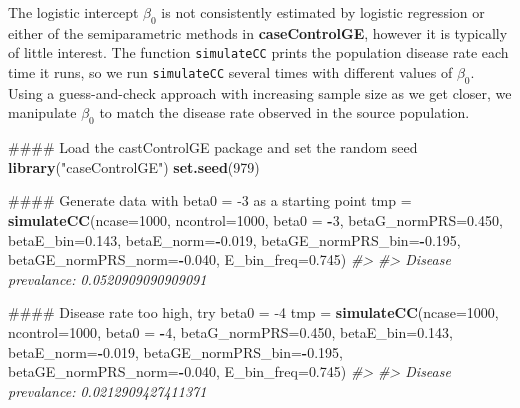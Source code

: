 \documentclass[]{article}
\newenvironment{Shaded}{\begin{snugshade}}{\end{snugshade}}
\newcommand{\KeywordTok}[1]{\textcolor[rgb]{0.13,0.29,0.53}{\textbf{#1}}}
\newcommand{\DataTypeTok}[1]{\textcolor[rgb]{0.13,0.29,0.53}{#1}}
\newcommand{\DecValTok}[1]{\textcolor[rgb]{0.00,0.00,0.81}{#1}}
\newcommand{\FloatTok}[1]{\textcolor[rgb]{0.00,0.00,0.81}{#1}}
\newcommand{\StringTok}[1]{\textcolor[rgb]{0.31,0.60,0.02}{#1}}
\newcommand{\CommentTok}[1]{\textcolor[rgb]{0.56,0.35,0.01}{\textit{#1}}}
\newcommand{\OperatorTok}[1]{\textcolor[rgb]{0.81,0.36,0.00}{\textbf{#1}}}
\newcommand{\NormalTok}[1]{#1}
\begin{document}
The logistic intercept \(\beta_0\) is not consistently estimated by
logistic regression or either of the semiparametric methods in
\textbf{caseControlGE}, however it is typically of little interest. The
function \texttt{simulateCC} prints the population disease rate each
time it runs, so we run \texttt{simulateCC} several times with different
values of \(\beta_0\). Using a guess-and-check approach with increasing
sample size as we get closer, we manipulate \(\beta_0\) to match the
disease rate observed in the source population.

\begin{Shaded}
\begin{Highlighting}[]
\NormalTok{#### Load the castControlGE package and set the random seed}
\KeywordTok{library}\NormalTok{(}\StringTok{"caseControlGE"}\NormalTok{)}
\KeywordTok{set.seed}\NormalTok{(}\DecValTok{979}\NormalTok{)}

\NormalTok{#### Generate data with beta0 = -3 as a starting point}
\NormalTok{tmp =}\StringTok{ }\KeywordTok{simulateCC}\NormalTok{(}\DataTypeTok{ncase=}\DecValTok{1000}\NormalTok{, }\DataTypeTok{ncontrol=}\DecValTok{1000}\NormalTok{, }\DataTypeTok{beta0 =} \OperatorTok{-}\DecValTok{3}\NormalTok{, }\DataTypeTok{betaG_normPRS=}\FloatTok{0.450}\NormalTok{, }
                 \DataTypeTok{betaE_bin=}\FloatTok{0.143}\NormalTok{, }\DataTypeTok{betaE_norm=}\OperatorTok{-}\FloatTok{0.019}\NormalTok{, }\DataTypeTok{betaGE_normPRS_bin=}\OperatorTok{-}\FloatTok{0.195}\NormalTok{, }
                 \DataTypeTok{betaGE_normPRS_norm=}\OperatorTok{-}\FloatTok{0.040}\NormalTok{, }\DataTypeTok{E_bin_freq=}\FloatTok{0.745}\NormalTok{)}
\CommentTok{#> }
\CommentTok{#> Disease prevalance: 0.0520909090909091}

\NormalTok{#### Disease rate too high, try beta0 = -4}
\NormalTok{tmp =}\StringTok{ }\KeywordTok{simulateCC}\NormalTok{(}\DataTypeTok{ncase=}\DecValTok{1000}\NormalTok{, }\DataTypeTok{ncontrol=}\DecValTok{1000}\NormalTok{, }\DataTypeTok{beta0 =} \OperatorTok{-}\DecValTok{4}\NormalTok{, }\DataTypeTok{betaG_normPRS=}\FloatTok{0.450}\NormalTok{, }
                 \DataTypeTok{betaE_bin=}\FloatTok{0.143}\NormalTok{, }\DataTypeTok{betaE_norm=}\OperatorTok{-}\FloatTok{0.019}\NormalTok{, }\DataTypeTok{betaGE_normPRS_bin=}\OperatorTok{-}\FloatTok{0.195}\NormalTok{, }
                 \DataTypeTok{betaGE_normPRS_norm=}\OperatorTok{-}\FloatTok{0.040}\NormalTok{, }\DataTypeTok{E_bin_freq=}\FloatTok{0.745}\NormalTok{)}
\CommentTok{#> }
\CommentTok{#> Disease prevalance: 0.0212909427411371}


\end{Highlighting}
\end{Shaded}
\end{document}
